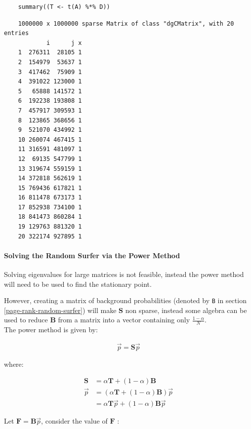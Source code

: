 \documentclass[11pt, twoside]{report}
\begin{document}
\begin{tcolorbox}
    \begin{verbatim}
    summary((T <- t(A) %*% D))
    \end{verbatim}
\tcblower
    \begin{verbatim}
    1000000 x 1000000 sparse Matrix of class "dgCMatrix", with 20 entries
            i      j x
    1  276311  28105 1
    2  154979  53637 1
    3  417462  75909 1
    4  391022 123000 1
    5   65888 141572 1
    6  192238 193808 1
    7  457917 309593 1
    8  123865 368656 1
    9  521070 434992 1
    10 260074 467415 1
    11 316591 481097 1
    12  69135 547799 1
    13 319674 559159 1
    14 372818 562619 1
    15 769436 617821 1
    16 811478 673173 1
    17 852938 734100 1
    18 841473 860284 1
    19 129763 881320 1
    20 322174 927895 1
    \end{verbatim}
\end{tcolorbox}

\paragraph{Solving the Random Surfer via the Power Method}
\label{random-surfer-sparse-fix}
Solving eigenvalues for large matrices is not feasible, instead the power method will need to be used to find the stationary point.

However, creating a matrix of background probabilities (denoted by \texttt{B} in section \ref{page-rank-random-surfer}) will make \(\mathbf{S}\)  non sparse, instead some algebra can be used to reduce \(\mathbf{B}\) from a matrix into a vector containing only \(\frac{1-\alpha}{N}\).
\ \\
The power method is given by:

\begin{align}
\vec{p}= \mathbf{S} \vec{p}
\end{align}

where:

\begin{align}
\mathbf{S} &= \alpha \mathbf{T} +  \left( 1 - \alpha \right) \mathbf{B} \\
\vec{p} &= \left( \alpha \mathbf{T} +  \left( 1 - \alpha \right) \mathbf{B} \right) \vec{p}\\
&= \alpha \mathbf{T}\vec{p} +  \left( 1-\alpha \right) \mathbf{B} \vec{p}
\end{align}

Let \(\mathbf{F}= \mathbf{B}\vec{p}\), consider the value of \(\mathbf{F}\) :
\end{document}
